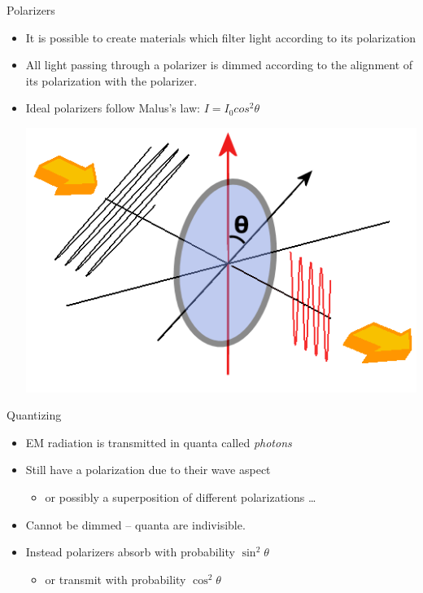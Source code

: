 \documentclass[pdf]{beamer}
\begin{document}
\begin{frame}{Polarizers}
  \begin{itemize}
  \item It is possible to create materials which filter light according to its
    polarization
  \item All light passing through a polarizer is dimmed according to the
    alignment of its polarization with the polarizer.
  \item Ideal polarizers follow Malus's law: $I = I_0 cos^2 \theta$
    \begin{center}
      \includegraphics[scale=0.25]{images/Loi_de_malus.png}
    \end{center}
  \end{itemize}
\end{frame}
\begin{frame}{Quantizing}
  \begin{itemize}
  \item EM radiation is transmitted in quanta called \emph{photons}
  \item Still have a polarization due to their wave aspect
    \begin{itemize}
    \item or possibly a superposition of different polarizations \ldots
    \end{itemize}
  \item Cannot be dimmed -- quanta are indivisible.
  \item Instead polarizers absorb with probability $\sin^2\theta$
    \begin{itemize}
    \item or transmit with probability $\cos^2\theta$
    \end{itemize}
  \end{itemize}
\end{frame}
\end{document}
